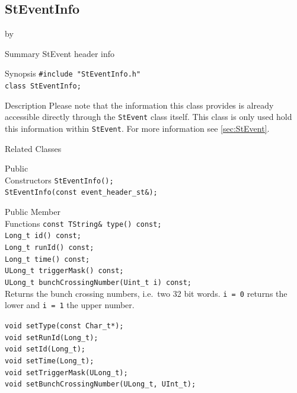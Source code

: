\documentclass[twoside]{article}
\newcommand{\entrylabel}[1]{\mbox{\textbf{{#1}}}\hfil}%
\newenvironment{entry}
{\begin{list}{}%
    {\renewcommand{\makelabel}{\entrylabel}%
     \setlength{\labelwidth}{90pt}%
     \setlength{\leftmargin}{\labelwidth}
     \advance\leftmargin by \labelsep%
      }%
    }%
  {\end{list}}
\newcommand{\Entrylabel}[1]%
{\raisebox{0pt}[1ex][0pt]{\makebox[\labelwidth][l]%
    {\parbox[t]{\labelwidth}{\hspace{0pt}\textbf{{#1}}}}}}
\newenvironment{Entry}%
{\renewcommand{\entrylabel}{\Entrylabel}\begin{entry}}%
  {\end{entry}}
\begin{document}
\subsection{StEventInfo}
\label{sec:StEventInfo}
\begin{Entry}
\item[Summary] StEvent header info

\item[Synopsis]
    \verb+#include "StEventInfo.h"+\\
    \verb+class StEventInfo;+\\

\item[Description] Please note that the information this class provides
    is already accessible directly through the \texttt{StEvent} class
    itself. This class is only used hold this information within
    \texttt{StEvent}. For more information see \ref{sec:StEvent}.

\item[Related Classes]
\item[Public\\ Constructors]
    \verb+StEventInfo();+\\
    \verb+StEventInfo(const event_header_st&);+\\
\item[Public Member\\ Functions]
    \verb+const TString& type() const;+\\
    \verb+Long_t id() const;+\\
    \verb+Long_t runId() const;+\\
    \verb+Long_t time() const;+\\
    \verb+ULong_t triggerMask() const;+\\

    \verb+ULong_t bunchCrossingNumber(Uint_t i) const;+\\
    Returns the bunch crossing numbers, i.e.~two 32 bit words.
    \texttt{i = 0} returns the lower and \texttt{i = 1} the upper number.

    \verb+void setType(const Char_t*);+\\
    \verb+void setRunId(Long_t);+\\
    \verb+void setId(Long_t);+\\
    \verb+void setTime(Long_t);+\\
    \verb+void setTriggerMask(ULong_t);+\\
    \verb+void setBunchCrossingNumber(ULong_t, UInt_t);+\\
\end{Entry}
\clearpage
\end{document}
